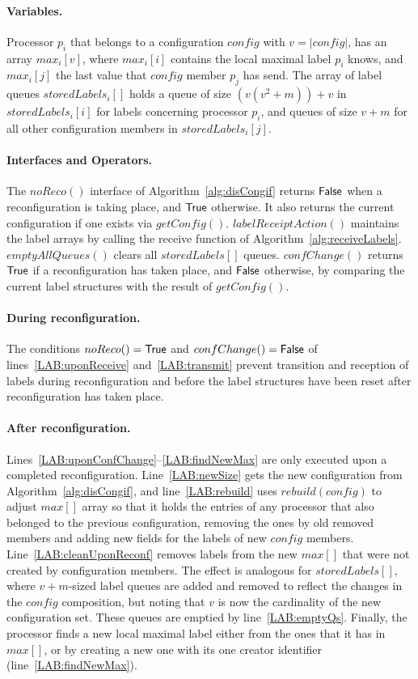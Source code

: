 \documentclass[11pt]{article}
\newcommand{\noReconfig}{noReco}
\begin{document}
\paragraph{Variables.} Processor $p_i$ that belongs to a configuration $config$ with $v=|config|$, has an array $max_i[v]$, where $max_i[i]$ contains the local maximal label $p_i$ knows, and $max_i[j]$ the last value that $config$ member $p_j$ has send.
The array of label queues $storedLabels_i[]$ holds a queue of size $(v(v^2+m))+v$ in $storedLabels_i[i]$ for labels concerning processor $p_i$, and queues of size $v+m$ for all other configuration members in $storedLabels_i[j]$.

\paragraph{Interfaces and Operators.}
The $\noReconfig()$ interface of Algorithm~\ref{alg:disCongif}  returns $\sf False$ when a reconfiguration is taking place, and $\sf True$ otherwise. It also returns the current configuration if one exists via $getConfig()$.
$labelReceiptAction()$ maintains the label arrays by calling the receive function of Algorithm~\ref{alg:receiveLabels}.
$emptyAllQueues()$ clears all $storedLabels[]$ queues.
$confChange()$ returns $\sf True$ if a reconfiguration has taken place, and $\sf False$ otherwise, by comparing the current label structures with the result of $getConfig()$.

\paragraph{During reconfiguration.}  The conditions $ \noReconfig() = {\sf True}$ and  $confChange() = \sf False$ of lines~\ref{LAB:uponReceive} and~\ref{LAB:transmit} prevent transition and reception of labels during reconfiguration and before the label structures have been reset after reconfiguration has taken place.  

\paragraph{After reconfiguration.} Lines~\ref{LAB:uponConfChange}--\ref{LAB:findNewMax} are only executed upon a completed reconfiguration.
Line~\ref{LAB:newSize} gets the new configuration from Algorithm~\ref{alg:disCongif}, and line~\ref{LAB:rebuild} uses $rebuild(config)$ to adjust $max[]$ array so that it holds the entries of any processor that also belonged to the previous configuration, removing the ones by old removed members and adding new fields for the labels of new $config$ members.
Line~\ref{LAB:cleanUponReconf} removes labels from the new $max[]$ that were not created by configuration members. 
The effect is analogous for $storedLabels[]$, where $v+m$-sized label queues are added and removed to reflect the changes in the $config$ composition, but noting that $v$ is now the cardinality of the new configuration set.
These queues are emptied by line~\ref{LAB:emptyQs}.
Finally, the processor finds a new local maximal label either from the ones that it has in $max[]$, or by creating a new one with its one creator identifier (line~\ref{LAB:findNewMax}).
\end{document}

